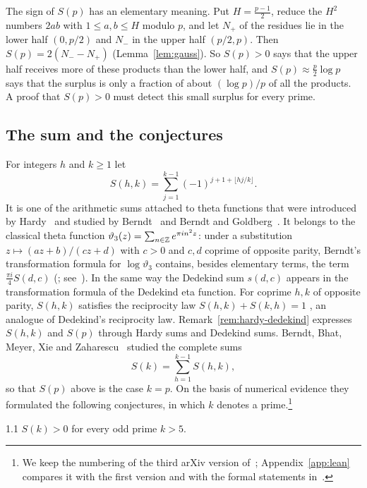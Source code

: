 The sign of $S(p)$ has an elementary meaning. Put $H=\frac{p-1}2$, reduce the $H^2$ numbers $2ab$ with $1\le a,b\le H$ modulo $p$, and let $N_+$ of the residues lie in the lower half $(0,p/2)$ and $N_-$ in the upper half $(p/2,p)$. Then $S(p)=2(N_--N_+)$ (Lemma~\ref{lem:gauss}). So $S(p)>0$ says that the upper half receives more of these products than the lower half, and $S(p)\approx\frac p2\log p$ says that the surplus is only a fraction of about $(\log p)/p$ of all the products. A proof that $S(p)>0$ must detect this small surplus for every prime.

\subsection{The sum and the conjectures}\label{subsec:conjectures}
For integers $h$ and $k\ge1$ let
\begin{equation}\label{eq:Shk}
S(h,k)=\sum_{j=1}^{k-1}(-1)^{j+1+\lfloor hj/k\rfloor}.
\end{equation}
It is one of the arithmetic sums attached to theta functions that were introduced by Hardy~\cite{b14} and studied by Berndt~\cite{b2} and Berndt and Goldberg~\cite{b3}. It belongs to the classical theta function $\vartheta_3(z)=\sum_{n\in\mathbb{Z}}e^{\pi in^2z}$: under a substitution $z\mapsto(az+b)/(cz+d)$ with $c>0$ and $c,d$ coprime of opposite parity, Berndt's transformation formula for $\log\vartheta_3$ contains, besides elementary terms, the term $\frac{\pi i}4S(d,c)$ (\cite[Theorem~4.1]{b2}; see~\cite[Section~2]{b1}). In the same way the Dedekind sum $s(d,c)$ appears in the transformation formula of the Dedekind eta function. For coprime $h,k$ of opposite parity, $S(h,k)$ satisfies the reciprocity law $S(h,k)+S(k,h)=1$ \cite[Theorem~4.2]{b2}, an analogue of Dedekind's reciprocity law. Remark~\ref{rem:hardy-dedekind} expresses $S(h,k)$ and $S(p)$ through Hardy sums and Dedekind sums. Berndt, Bhat, Meyer, Xie and Zaharescu~\cite{b1} studied the complete sums
\begin{equation}\label{eq:Sk}
S(k)=\sum_{h=1}^{k-1}S(h,k),
\end{equation}
so that $S(p)$ above is the case $k=p$. On the basis of numerical evidence they formulated the following conjectures, in which $k$ denotes a prime.\footnote{We keep the numbering of the third arXiv version of~\cite{b1}; Appendix~\ref{app:lean} compares it with the first version and with the formal statements in~\cite{b11}.}

\begin{bconj}[positivity]{1.1}
$S(k)>0$ for every odd prime $k>5$.
\end{bconj}

